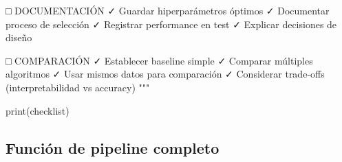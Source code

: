 \documentclass[
  doc,
  floatsintext,
  longtable,
  a4paper,
  nolmodern,
  notxfonts,
  notimes,
  12pt,
  colorlinks=true,linkcolor=blue,citecolor=blue,urlcolor=blue]{apa7}
\newenvironment{Shaded}{\begin{snugshade}}{\end{snugshade}}
\newcommand{\BuiltInTok}[1]{\textcolor[rgb]{0.00,0.23,0.31}{#1}}
\newcommand{\NormalTok}[1]{\textcolor[rgb]{0.00,0.23,0.31}{#1}}
\newcommand{\StringTok}[1]{\textcolor[rgb]{0.13,0.47,0.30}{#1}}
\begin{document}
\begin{Shaded}
\begin{Highlighting}[]
\StringTok{□ DOCUMENTACIÓN}
\StringTok{  ✓ Guardar hiperparámetros óptimos}
\StringTok{  ✓ Documentar proceso de selección}
\StringTok{  ✓ Registrar performance en test}
\StringTok{  ✓ Explicar decisiones de diseño}

\StringTok{□ COMPARACIÓN}
\StringTok{  ✓ Establecer baseline simple}
\StringTok{  ✓ Comparar múltiples algoritmos}
\StringTok{  ✓ Usar mismos datos para comparación}
\StringTok{  ✓ Considerar trade{-}offs (interpretabilidad vs accuracy)}
\StringTok{"""}

\BuiltInTok{print}\NormalTok{(checklist)}
\end{Highlighting}
\end{Shaded}

\subsection{Función de pipeline
completo}\label{funciuxf3n-de-pipeline-completo}
\end{document}
